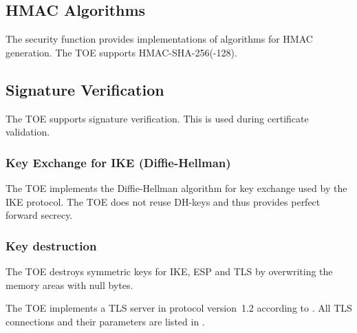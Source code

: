 \subsection{HMAC Algorithms}%
\label{sf.cryptographicservices.hmac}

The security function provides implementations of algorithms for HMAC
generation. The TOE supports HMAC-SHA-256(-128).



\subsection{Signature Verification}%
\label{sf.cryptographicservices.sigver}

The TOE supports signature verification. This is used during certificate
validation.

\subsubsection{Key Exchange for  IKE (Diffie-Hellman)}%
\label{sf.cryptographicservices.ipsec.keyexc}

The TOE implements the Diffie-Hellman algorithm for key exchange used by the IKE
protocol. The TOE does not reuse DH-keys and thus provides perfect forward
secrecy.


\subsubsection{Key destruction}%
\label{sf.cryptographicservices.ipsec.keydest}

The TOE destroys symmetric keys for IKE, ESP and TLS by overwriting the memory
areas with null bytes.



The TOE implements a TLS server in protocol version~1.2 according to
. All TLS connections and their parameters are listed in
.


